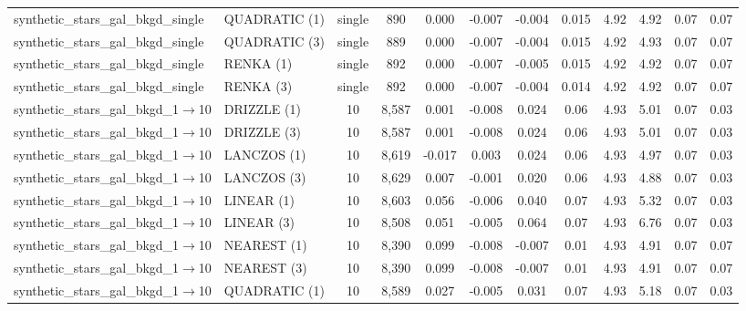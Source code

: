 \begin{table}
\begin{center}
\begin{tabular}{|l|l|c|c|c|c|c|c|c|c|c|c|}
synthetic\_stars\_gal\_bkgd\_single 	              & QUADRATIC (1)  & single 	& 890 	& 0.000       & -0.007  	& -0.004 & 0.015          & 4.92  & 4.92  		& 0.07  & 0.07    \\
synthetic\_stars\_gal\_bkgd\_single 	              & QUADRATIC (3)  & single 	& 889 	& 0.000       & -0.007  	& -0.004 & 0.015          & 4.92  & 4.93   		& 0.07  & 0.07    \\
synthetic\_stars\_gal\_bkgd\_single 	              & RENKA (1)           & single 	& 892 	& 0.000       & -0.007  	& -0.005 & 0.015          & 4.92  & 4.92 		& 0.07  & 0.07   \\
synthetic\_stars\_gal\_bkgd\_single                & RENKA (3)           & single  	& 892 	& 0.000       & -0.007  	& -0.004 & 0.014          & 4.92  & 4.92  		& 0.07  & 0.07    \\
\midrule
synthetic\_stars\_gal\_bkgd\_1$\to$10   	& DRIZZLE (1)        &10    		&  8,587 	& 0.001       & -0.008  	& 0.024  & 0.06 	& 4.93  & 5.01  			& 0.07    & 0.03  \\
synthetic\_stars\_gal\_bkgd\_1$\to$10   	& DRIZZLE (3)        &10    		&  8,587 	& 0.001       & -0.008  	& 0.024  & 0.06 	& 4.93  & 5.01 			& 0.07    & 0.03  \\
synthetic\_stars\_gal\_bkgd\_1$\to$10   	& LANCZOS (1)      &10    		&  8,619 	& -0.017      & 0.003   	& 0.024  & 0.06		& 4.93  & 4.97  			& 0.07    & 0.03  \\
synthetic\_stars\_gal\_bkgd\_1$\to$10   	& LANCZOS (3)     &10    			&  8,629 	& 0.007       & -0.001  	& 0.020  & 0.06 	& 4.93  & 4.88  			& 0.07    & 0.03  \\
synthetic\_stars\_gal\_bkgd\_1$\to$10   	& LINEAR (1)         &10 	   		&  8,603 	& 0.056       & -0.006  	& 0.040  & 0.07 	& 4.93  & 5.32  			& 0.07    & 0.03  \\
synthetic\_stars\_gal\_bkgd\_1$\to$10   	& LINEAR (3)         &10 	   		&  8,508 	& 0.051       & -0.005  	& 0.064  & 0.07  	& 4.93  & 6.76   		& 0.07    & 0.03  \\
synthetic\_stars\_gal\_bkgd\_1$\to$10   	& NEAREST (1)     &10    			&  8,390 	& 0.099       & -0.008  	&-0.007  & 0.01 	& 4.93  & 4.91 			& 0.07    & 0.07  \\
synthetic\_stars\_gal\_bkgd\_1$\to$10   	& NEAREST (3)     &10    			&  8,390 	& 0.099       & -0.008  	&-0.007  & 0.01 	& 4.93  & 4.91  			& 0.07    & 0.07  \\
synthetic\_stars\_gal\_bkgd\_1$\to$10   	& QUADRATIC (1) &10  			&  8,589 	& 0.027       & -0.005  	& 0.031  & 0.07 	& 4.93  & 5.18  			& 0.07   & 0.03  \\

\end{tabular}
\end{center}
\end{table}

